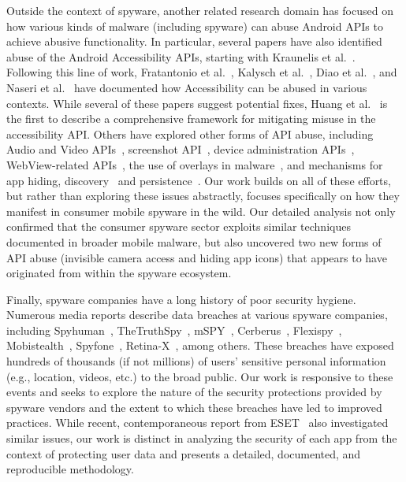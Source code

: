 Outside the context of spyware, another related research
domain has focused on how various kinds of malware (including spyware)
can abuse Android APIs to achieve abusive functionality.  In
particular, several papers have also identified abuse of the Android
Accessibility APIs, starting with Kraunelis et
al.~\cite{kraunelis2013malware}.  Following this line of work,
Fratantonio et al.~\cite{fratantonio2017cloak}, Kalysch et
al.~\cite{kalysch2018android}, Diao et al.~\cite{diao2019kindness},
and Naseri et al.~\cite{naseri2019accessileaks} have documented how
Accessibility can be abused in various contexts.  While several of
these papers suggest potential fixes, Huang et
al.~\cite{huang2021a11y} is the first to describe a comprehensive
framework for mitigating misuse in the accessibility API.  Others have
explored other forms of API abuse, including Audio and Video
APIs~\cite{petracca2015audroid, pan2018panoptispy}, screenshot API~\cite{sbai2022threat}, device
administration APIs~\cite{shan2019device}, WebView-related APIs~\cite{luo2011attacks, chin2013bifocals, neugschwandtner2013view, ZhangIdentity2022}, the use of overlays in
malware~\cite{yan2019understanding}, and mechanisms for app
hiding, discovery~\cite{shan2018self, pham2019hidemyapp} and
persistence~\cite{zhou2020demystifying}.  Our work builds on all of
these efforts, but rather than exploring these issues abstractly,
focuses specifically on how they manifest in consumer mobile spyware
in the wild.  Our detailed analysis not only confirmed that the consumer spyware sector exploits similar techniques documented in broader mobile malware, but also uncovered two new forms of API
abuse (invisible camera access and hiding app icons) that appears to have originated from within the spyware ecosystem.

Finally, spyware companies have a long history of poor security hygiene.
Numerous media reports describe data breaches at various spyware companies, including Spyhuman~\cite{HackerSt66:online}, TheTruthSpy~\cite{Companyt8:online}, mSPY~\cite{mSpybrea38:online,mSpyCybe86:online}, Cerberus~\cite{Cerberus12:online}, Flexispy~\cite{Stalkerw59:online}, Mobistealth~\cite{HackerSt50:online}, Spyfone~\cite{Spywaref13:online}, Retina-X~\cite{RetinaXa98:online, Hackercl62:online}, among others. These breaches have exposed hundreds of thousands (if not millions) of users' sensitive personal information (e.g., location, videos, etc.) to the broad public. Our work is responsive to these events and seeks to explore the nature of the security protections provided by spyware vendors and the extent to which these breaches have led to improved practices. While recent, contemporaneous report from ESET~\cite{esetandr4:online} also investigated similar issues, our work is distinct in analyzing the security of each app from the context of protecting user data and presents a detailed, documented, and reproducible methodology.

